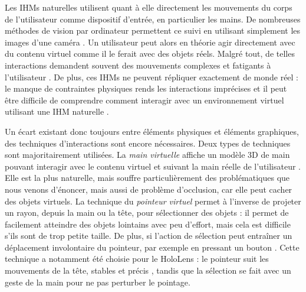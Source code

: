 
Les IHMs naturelles utilisent quant à elle directement les mouvements du corps de l'utilisateur comme dispositif d'entrée, en particulier les mains. De nombreuses méthodes de vision par ordinateur permettent ce suivi en utilisant simplement les images d'une caméra \citep{Billinghurst2015}. Un utilisateur peut alors en théorie agir directement avec du contenu virtuel comme il le ferait avec des objets réels. Malgré tout, de telles interactions demandent souvent des mouvements complexes et fatigants à l'utilisateur \citep{Bowman2001}. De plus, ces IHMs ne peuvent répliquer exactement de monde réel : le manque de contraintes physiques rends les interactions imprécises \citep{Chan2010} et il peut être difficile de comprendre comment interagir avec un environnement virtuel utilisant une IHM naturelle \citep{Argelaguet2013}.


Un écart existant donc toujours entre éléments physiques et éléments graphiques, des techniques d'interactions sont encore nécessaires. Deux types de techniques sont majoritairement utilisées. La \emph{main virtuelle} affiche un modèle 3D de main pouvant interagir avec le contenu virtuel et suivant la main réelle de l'utilisateur . Elle est la plus naturelle, mais souffre particulièrement des problématiques que nous venons d'énoncer, mais aussi de problème d'occlusion, car elle peut cacher des objets virtuels. La technique du \emph{pointeur virtuel} permet à l'inverse de projeter un rayon, depuis la main ou la tête, pour sélectionner des objets  : il permet de facilement atteindre des objets lointains avec peu d'effort, mais cela est difficile s'ils sont de trop petite taille. De plus, si l'action de sélection peut entraîner un déplacement involontaire du pointeur, par exemple en pressant un bouton \citep{Argelaguet2013}. Cette technique a notamment été choisie pour le HoloLens : le pointeur suit les mouvements de la tête, stables et précis \citep{Kitoe2018}, tandis que la sélection se fait avec un geste de la main pour ne pas perturber le pointage.

